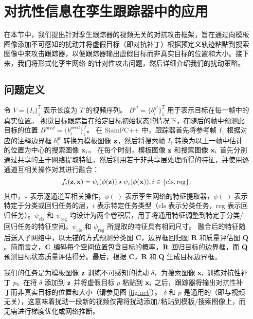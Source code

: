 \section{对抗性信息在孪生跟踪器中的应用}
在本节中，我们提出针对孪生跟踪器的视频无关的对抗攻击框架，旨在通过向模板图像添加不可感知的扰动并将虚假目标（即对抗补丁）根据预定义轨迹粘贴到搜索图像中来攻击跟踪器，以便跟踪器输出虚假目标而非真实目标的位置和大小。接下来，我们将形式化孪生网络 \cite{SiamFC++} 的针对性攻击问题，然后详细介绍我们的扰动策略。

\subsection{问题定义}
令 $V=\{I_i\}_1^T$ 表示长度为 $T$ 的视频序列。
$B^{gt}=\{b^{gt}_i\}_1^T$ 用于表示目标在每一帧中的真实位置。
视觉目标跟踪旨在给定目标初始状态的情况下，在随后的帧中预测此目标的位置 $B^{pred}=\{b^{pred}_i\}_1^T$。
在 SiamFC++ 中，跟踪器首先将参考帧 $I_1$ 根据对应的注释边界框 $b_1^{gt}$ 转换为模板图像 $\textbf z$，然后将搜索帧 $I_i$ 转换为以上一帧中估计的位置为中心的搜索图像 $\textbf x_i$。
在每个时刻，模板图像 $\textbf z$ 和搜索图像 $\textbf x_i$ 首先分别通过共享的主干网络提取特征，然后利用若干非共享层处理所得的特征，并使用逐通道互相关操作对其进行融合：
\begin{equation}
f_{i}(\textbf z, \textbf x)=\psi_{i}(\phi(\textbf z)) \star \psi_{i}(\phi(\textbf x)), i \in\{\mathrm{cls}, \mathrm{reg}\}.
\end{equation}
其中，$\star$ 表示逐通道互相关操作，$\phi(\cdot)$ 表示孪生网络的特征提取器，$\psi(\cdot)$ 表示特定于分类或回归任务的层，$i$ 表示特定任务类型（$\mathrm{cls}$ 表示分类任务，$\mathrm{reg}$ 表示回归任务）。$\psi_{\mathrm{cls}}$ 和 $\psi_{\mathrm{reg}}$ 均设计为两个卷积层，用于将通用特征调整到特定于分类/回归任务的特征空间。$\psi_{\mathrm{cls}}$ 和 $\psi_{\mathrm{reg}}$ 所提取的特征具有相同尺寸。
融合后的特征随后送入子网络中，以无锚的方式预测分类图 $\textbf{C}$，边界框回归图 $\textbf{R}$ 和质量评估图 $\textbf{Q}$。简而言之，$\textbf C$ 编码每个空间位置包含目标的概率，$\textbf R$ 回归目标的边界框，而 $\textbf Q$ 预测目标状态质量评估得分。最后，根据 $\textbf{C}$，$\textbf{R}$ 和 $\textbf{Q}$ 生成目标边界框。

我们的任务是为模板图像 $\textbf z$ 训练不可感知的扰动 $\delta$，为搜索图像 $\textbf x_i$ 训练对抗性补丁 $p$。在将 $\delta$ 添加到 $\textbf z$ 并将虚假目标 $p$ 粘贴到 $\textbf x_i$ 之后，跟踪器将输出对抗性补丁而非真实目标的位置和大小（请参见图 \ref{fig:net}）。
$\delta$ 和 $p$ 是通用的（即与视频无关），这意味着扰动一段新的视频仅需将扰动添加/粘贴到模板/搜索图像上，而无需进行梯度优化或网络推断。

